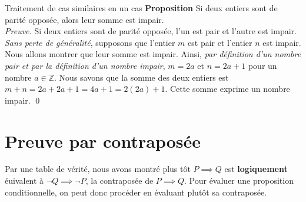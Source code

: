 \documentclass[16pt]{report}
\begin{document}
\begin{multicols*}{2}
            \begin{Preuve}{Traitement de cas similaires en un cas}{}
                \textbf{Proposition} \quad Si deux entiers sont de parité opposée, alors leur somme est impair. 
                \vspace{1em} \\
                \textit{Preuve.} \quad Si deux entiers sont de parité opposée, l'un est pair et l'autre est impair. 
                \textit{Sans perte de généralité},  supposons que l'entier $m$ est pair et l'entier $n$ est impair. 
                Nous allons montrer que leur somme est impair. Ainsi, 
                \textit{par définition d'un nombre pair et par la définition d'un nombre impair}, 
                $m = 2a$  et $n = 2a + 1$ pour un nombre $a \in \mathbb{Z}$. Nous savons que la somme des deux 
                entiers est $m + n = 2a + 2a +1 = 4a + 1 = 2(2a) + 1$. Cette somme exprime un nombre impair. \qed
            \end{Preuve}





            \section{\textcolor{myp}{\textbf{Preuve par contraposée}}} 

            Par une table de vérité, nous avons montré plus tôt $P \implies Q$ est \textbf{logiquement} 
            éuivalent à $\neg Q \implies \neg P$, la \textcolor{myb}{contraposée} de $P \implies  Q$. Pour évaluer 
            une proposition conditionnelle, on peut donc procéder en évaluant plutôt sa contraposée.



            \begin{center}
            \noindent{}
\end{center}
\end{multicols*}
\end{document}
